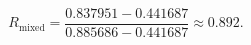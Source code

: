 \begin{equation*}
R_{\mathrm{mixed}}=\frac{0.837951-0.441687}{0.885686-0.441687}\approx 0.892.
\end{equation*}

